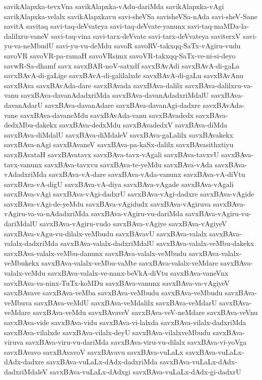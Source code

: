 {savikAlapxka-tevxVna
savikAlapxka-vAdu-dariMda
savikAlapxka-vAgi
savikAlapxka-velalx
savikAlapxkavu
savi-sheVSa
savisheVSa-nAda
savi-sheV-Sane
savitA
savitaq
savi-taq-deVvateya
savi-taq-deVvate-yanunx
savi-taq-maMDa-la-dalilxru-vaneV
savi-taq-vina
savi-tarx-deVvate
savi-tarx-deVvateya
saviterxV
savi-yu-va-neMbudU
savi-yu-vu-deMdu
savoR
savoRV-takxqq-SaTx-vAgiru-vudu
savoVR
savoVR-pa-ramaH
savoVRsimx
savoVR-takxqq-SaTx-ve-ni-si-deyo
savwR-Sa-dhamf
savx
savxBAR-noV-satxdf
savxBAvAdi
savxBAvA-di-gaLa
savxBAvA-di-gaLige
savxBAvA-di-galilalxde
savxBAvA-di-gaLu
savxBAvAnu
savxBAva
savxBAvAda-dare
savxBAvada
savxBAva-dalilx
savxBAva-dalilxru-va-vanu
savxBAva-davanAdadxriMda
savxBAva-davanAdadxriMdalU
savxBAva-davanAdarU
savxBAva-davanAdare
savxBAva-davanAgi-dadxre
savxBAvAda-vane
savxBAva-davaneMdu
savxBAvAda-vanu
savxBAvadedx
savxBAva-dedxMbu-dakekx
savxBAva-dedxMdu
savxBAvadedxV
savxBAva-diMda
savxBAva-diMdalU
savxBAva-diMdaleV
savxBAva-gaLalilx
savxBAvakekx
savxBAva-nAgi
savxBAvaneV
savxBAva-pa-kaSx-dalilx
savxBAvasithxtiyu
savxBAvataH
savxBAvatavx
savxBAva-tavx-vAgali
savxBAva-tavxvU
savxBAva-tavx-vanunx
savxBAva-tavxvu
savxBAva-te-yeMdu
savxBAva-vAda
savxBAva-vAdadxriMda
savxBAva-vA-dare
savxBAva-vAda-vanunx
savxBAva-vA-diVtu
savxBAva-vA-digU
savxBAva-vA-diya
savxBAva-vAgade
savxBAva-vAgali
savxBAva-vAgi
savxBAva-vAgi-dadxrU
savxBAva-vAgi-dadxre
savxBAva-vAgide
savxBAva-vAgi-de-yeMdu
savxBAva-vAgidudx
savxBAva-vAgiruva
savxBAva-vAgiru-va-va-nAdadxriMda
savxBAva-vAgiru-vu-dariMda
savxBAva-vAgiru-vu-dariMdalU
savxBAva-vAgiru-vudo
savxBAva-vAgiye
savxBAva-vAgiyeV
savxBAva-vAgu-vu-dilalx-veMbudu
savxBAvavU
savxBAva-valalx
savxBAva-valalx-dadxriMda
savxBAva-valalx-dadxriMdalU
savxBAva-valalx-veMbu-dakekx
savxBAva-valalx-veMbu-danunx
savxBAva-valalx-veMbudu
savxBAva-valalx-veMbukekx
savxBAva-valalx-veMbu-vaMte
savxBAva-valalx-veMdare
savxBAva-valalx-veMdu
savxBAva-valalx-ve-nanx-beVkA-diVtu
savxBAva-vaneVnx
savxBAva-va-ninx-TuTx-koMDu
savxBAva-vanunx
savxBAva-va-vAgiyeV
savxBAvave
savxBAva-veMba
savxBAva-veMbudu
savxBAva-veMbudu
savxBAva-veMbuva
savxBAva-veMdU
savxBAva-veMdalilx
savxBAva-veMdarU
savxBAva-veMdare
savxBAva-veMdu
savxBAvaveV
savxBAva-veV-neMdare
savxBAva-veVnu
savxBAva-vide
savxBAva-vidu
savxBAva-vi-lalxda
savxBAva-vilalx-dadxriMda
savxBAva-vilalxde
savxBAva-vilalx-deyU
savxBAva-vilalxveMbudu
savxBAva-viruva
savxBAva-viru-vu-dariMda
savxBAva-viru-vu-dilalx
savxBAva-vi-yoVga
savxBAvavo
savxBAvavoV
savxBAvavu
savxBAva-vuLaLx
savxBAva-vuLaLx-dAdx-dadxre
savxBAva-vuLaLx-dAdx-dadxriMda
savxBAva-vuLaLx-dAdx-dadxriMdaleV
savxBAva-vuLaLx-dAdxgi
savxBAva-vuLaLx-dAdx-gi-dadxrU
}
